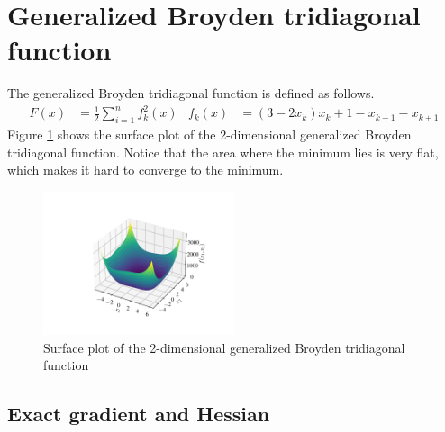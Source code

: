 \section{Generalized Broyden tridiagonal function}
\label{sec:generalized_broyden_results}

The generalized Broyden tridiagonal function is defined as follows.
\begin{align}
F(x) &= \frac12 \sum_{i=1}^n f_k^2(x) &
f_k(x) &= (3-2x_k)x_k + 1 - x_{k-1} - x_{k+1}
\end{align}
Figure \ref{fig:generalized_broyden_surf} shows the surface plot of the 2-dimensional generalized Broyden tridiagonal function.
Notice that the area where the minimum lies is very flat, which makes it hard to converge to the minimum.

\begin{figure}
    \centering
    \includegraphics[width=0.5\textwidth]{figures/generalized_broyden_surf.pdf}
    \caption{Surface plot of the 2-dimensional generalized Broyden tridiagonal function}
    \label{fig:generalized_broyden_surf}
\end{figure}

\subsection{Exact gradient and Hessian}

